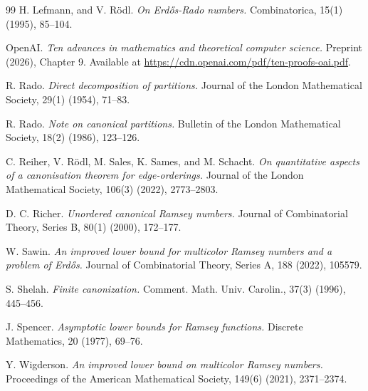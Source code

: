 \documentclass[10pt,a4paper]{article}
\theoremstyle{plain}
\theoremstyle{definition}
\begin{document}
\begin{thebibliography}{99}
H. Lefmann, and V. R{\"o}dl.
\emph{On Erd\H{o}s-Rado numbers.}
Combinatorica, 15(1) (1995), 85--104.

OpenAI.
\emph{Ten advances in mathematics and theoretical computer science.}
Preprint (2026), Chapter 9. Available at \url{https://cdn.openai.com/pdf/ten-proofs-oai.pdf}.

R. Rado.
\emph{Direct decomposition of partitions.}
Journal of the London Mathematical Society, 29(1) (1954), 71--83.

R. Rado.
\emph{Note on canonical partitions.}
Bulletin of the London Mathematical Society, 18(2) (1986), 123--126.

C. Reiher, V. R{\"o}dl, M. Sales, K. Sames, and M. Schacht.
\emph{On quantitative aspects of a canonisation theorem for edge-orderings.}
Journal of the London Mathematical Society, 106(3) (2022), 2773--2803.

D. C. Richer.
\emph{Unordered canonical Ramsey numbers.}
Journal of Combinatorial Theory, Series B, 80(1) (2000), 172--177.

W. Sawin.
\emph{An improved lower bound for multicolor Ramsey numbers and a problem of Erd\H{o}s.}
Journal of Combinatorial Theory, Series A, 188 (2022), 105579.

S. Shelah.
\emph{Finite canonization.}
Comment. Math. Univ. Carolin., 37(3) (1996), 445--456.

J. Spencer.
\emph{Asymptotic lower bounds for Ramsey functions.}
Discrete Mathematics, 20 (1977), 69--76.

Y. Wigderson.
\emph{An improved lower bound on multicolor Ramsey numbers.}
Proceedings of the American Mathematical Society, 149(6) (2021), 2371--2374.

\end{thebibliography}
\end{document}
